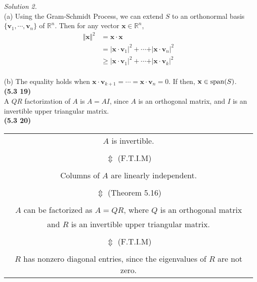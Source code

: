 \textit{Solution 2.} \\
(a) Using the Gram-Schmidt Process, we can extend $S$ to an orthonormal basis $\{ \textbf{v}_1, \cdots, \textbf{v}_n \}$ of $\mathbb{R}^n$. Then for any vector $\textbf{x} \in \mathbb{R}^n$, \begin{align*}
	\Vert \textbf{x} \Vert ^ 2 &= \textbf{x} \cdot \textbf{x} \\
	&= \vert \textbf{x} \cdot \textbf{v}_1 \vert ^ 2 + \cdots + \vert \textbf{x} \cdot \textbf{v}_n \vert ^2 \\
	&\ge \vert \textbf{x} \cdot \textbf{v}_1 \vert ^ 2 + \cdots + \vert \textbf{x} \cdot \textbf{v}_k \vert ^2
\end{align*} \\

(b) The equality holds when $\textbf{x} \cdot \textbf{v}_{k+1} = \cdots = \textbf{x} \cdot \textbf{v}_n = 0$. If then, $\textbf{x} \in \textnormal{span}(S)$. \\

\textbf{(5.3 19)} \\
A $QR$ factorization of $A$ is $A = AI$, since $A$ is an orthogonal matrix, and $I$ is an invertible upper triangular matrix. \\

\textbf{(5.3 20)} \\
\begin{table}[H]
	\begin{center}
		\begin{tabular}{c}
			$A$ is invertible. \\
			\\
			$\Updownarrow$ (F.T.I.M) \\
			\\
			Columns of $A$ are linearly independent. \\
			\\
			$\Updownarrow$ (Theorem 5.16) \\
			\\
			$A$ can be factorized as $A = QR$, where $Q$ is an orthogonal matrix \\ and $R$ is an invertible upper triangular matrix. \\
			\\
			$\Updownarrow$ (F.T.I.M) \\
			\\
			$R$ has nonzero diagonal entries, since the eigenvalues of $R$ are not zero.
		\end{tabular}
	\end{center}
\end{table}

